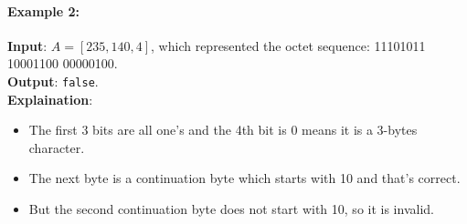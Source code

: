 \paragraph{Example 2:}

\begin{flushleft}
\textbf{Input}: $A = [235, 140, 4]$, which represented the octet sequence: 11101011 10001100 00000100.
\\
\textbf{Output}: \texttt{false}.
\\
\textbf{Explaination}:
\begin{itemize}
\item The first 3 bits are all one's and the 4th bit is 0 means it is a 3-bytes character.
\item The next byte is a continuation byte which starts with 10 and that's correct.
\item But the second continuation byte does not start with 10, so it is invalid.
\end{itemize}

\end{flushleft}